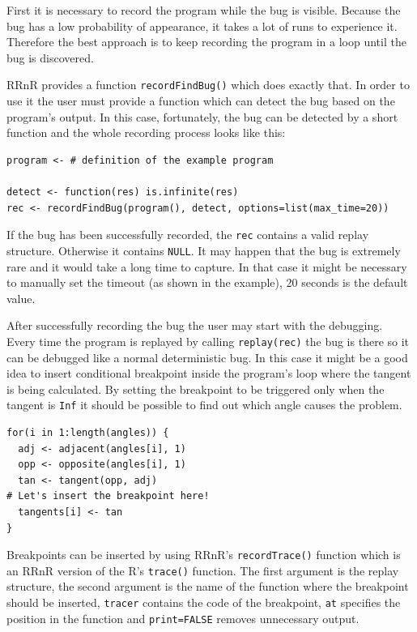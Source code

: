 \documentclass[thesis=M,english,hidelinks]{FITthesis}[2012/10/20]
\begin{document}
	First it is necessary to record the program while the bug is visible. Because the bug has a low probability of appearance, it takes a lot of runs to experience it. Therefore the best approach is to keep recording the program in a loop until the bug is discovered.\par
	
	RRnR provides a function \lstinline|recordFindBug()| which does exactly that. In order to use it the user must provide a function which can detect the bug based on the program's output. In this case, fortunately, the bug can be detected by a short function and the whole recording process looks like this:\par
	
\begin{lstlisting}[style=filestyle, caption={Recording the bug in the example program}]
program <- # definition of the example program

detect <- function(res) is.infinite(res)
rec <- recordFindBug(program(), detect, options=list(max_time=20))
\end{lstlisting}

	If the bug has been successfully recorded, the \lstinline|rec| contains a valid replay structure. Otherwise it contains \lstinline|NULL|. It may happen that the bug is extremely rare and it would take a long time to capture. In that case it might be necessary to manually set the timeout (as shown in the example), 20 seconds is the default value.\par
	
	After successfully recording the bug the user may start with the debugging. Every time the program is replayed by calling \lstinline|replay(rec)| the bug is there so it can be debugged like a normal deterministic bug. In this case it might be a good idea to insert conditional breakpoint inside the program's loop where the tangent is being calculated. By setting the breakpoint to be triggered only when the tangent is \lstinline|Inf| it should be possible to find out which angle causes the problem.\par
	
\begin{lstlisting}[style=filestyle, caption={The part of interest in the example program}]
for(i in 1:length(angles)) {
  adj <- adjacent(angles[i], 1)
  opp <- opposite(angles[i], 1)
  tan <- tangent(opp, adj)
# Let's insert the breakpoint here!
  tangents[i] <- tan
}
\end{lstlisting}
	
	Breakpoints can be inserted by using RRnR's \lstinline|recordTrace()| function which is an RRnR version of the R's \lstinline|trace()| function. The first argument is the replay structure, the second argument is the name of the function where the breakpoint should be inserted, \lstinline|tracer| contains the code of the breakpoint, \lstinline|at| specifies the position in the function and \lstinline|print=FALSE| removes unnecessary output.\par
	
\end{document}
